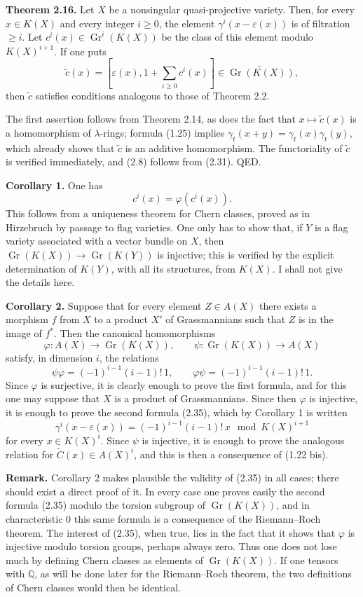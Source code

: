 \documentclass[11pt]{article}
\newcommand{\Gr}{\operatorname{Gr}}
\providecommand{\Q}{\mathbb Q}
\providecommand{\Gr}{\operatorname{Gr}}
\providecommand{\Ctil}{\widetilde C}
\providecommand{\Gr}{\operatorname{G}}
\begin{document}
\textbf{Theorem 2.16.} Let $X$ be a nonsingular quasi-projective variety. Then, for every $x\in K(X)$ and every integer $i\geq 0$, the element $\gamma^i(x-\varepsilon(x))$ is of filtration $\geq i$. Let $c^i(x)\in\Gr^i(K(X))$ be the class of this element modulo $K(X)^{i+1}$. If one puts
\[
 \widetilde c(x)=\left[\varepsilon(x),1+\sum_{i\geq 0}c^i(x)\right]\in \widetilde{\Gr(K(X))},
\]
then $\widetilde c$ satisfies conditions analogous to those of Theorem 2.2.

The first assertion follows from Theorem 2.14, as does the fact that $x\mapsto\widetilde c(x)$ is a homomorphism of $\lambda$-rings; formula (1.25) implies $\gamma_t(x+y)=\gamma_t(x)\gamma_t(y)$, which already shows that $\widetilde c$ is an additive homomorphism. The functoriality of $\widetilde c$ is verified immediately, and (2.8) follows from (2.31). QED.

\textbf{Corollary 1.} One has
\[
 c^i(x)=\varphi(c^i(x)).
\]
This follows from a uniqueness theorem for Chern classes, proved as in Hirzebruch by passage to flag varieties. One only has to show that, if $Y$ is a flag variety associated with a vector bundle on $X$, then $\Gr(K(X))\to\Gr(K(Y))$ is injective; this is verified by the explicit determination of $K(Y)$, with all its structures, from $K(X)$. I shall not give the details here.

\textbf{Corollary 2.} Suppose that for every element $Z\in A(X)$ there exists a morphism $f$ from $X$ to a product $X'$ of Grassmannians such that $Z$ is in the image of $f^*$. Then the canonical homomorphisms
\[
 \varphi:A(X)\longrightarrow \Gr(K(X)),\qquad
 \psi:\Gr(K(X))\longrightarrow A(X)
\]
satisfy, in dimension $i$, the relations
\begin{equation}\tag{2.35}
 \psi\varphi=(-1)^{i-1}(i-1)!\,1,
 \qquad
 \varphi\psi=(-1)^{i-1}(i-1)!\,1.
\end{equation}
Since $\varphi$ is surjective, it is clearly enough to prove the first formula, and for this one may suppose that $X$ is a product of Grassmannians. Since then $\varphi$ is injective, it is enough to prove the second formula (2.35), which by Corollary 1 is written
\[
 \gamma^i(x-\varepsilon(x))=(-1)^{i-1}(i-1)!\,x\mod K(X)^{i+1}
\]
for every $x\in K(X)^i$. Since $\psi$ is injective, it is enough to prove the analogous relation for $\Ctil(x)\in A(X)^i$, and this is then a consequence of (1.22 bis).

\textbf{Remark.} Corollary 2 makes plausible the validity of (2.35) in all cases; there should exist a direct proof of it. In every case one proves easily the second formula (2.35) modulo the torsion subgroup of $\Gr(K(X))$, and in characteristic $0$ this same formula is a consequence of the Riemann--Roch theorem. The interest of (2.35), when true, lies in the fact that it shows that $\varphi$ is injective modulo torsion groups, perhaps always zero. Thus one does not lose much by defining Chern classes as elements of $\Gr(K(X))$. If one tensors with $\Q$, as will be done later for the Riemann--Roch theorem, the two definitions of Chern classes would then be identical.
\end{document}

